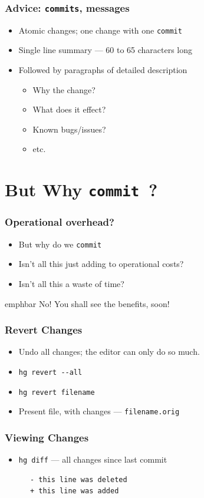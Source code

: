 \documentclass[14pt,compress]{beamer}
\newcommand{\emphbar}[1]
{\begin{beamercolorbox}[rounded=true]{emphbar} 
      {#1}
 \end{beamercolorbox}
}
\newcounter{time}
\newcommand{\typ}[1]{\lstinline{#1}}
\begin{document}
\begin{frame}
  \frametitle{\alert{Advice}: \typ{commits}, messages}
  \begin{itemize}
  \item Atomic changes; one change with one \typ{commit}
  \item Single line summary --- 60 to 65 characters long
  \item Followed by paragraphs of detailed description
    \begin{itemize}
    \item Why the change?
    \item What does it effect?
    \item Known bugs/issues?
    \item etc. 
    \end{itemize}
  \end{itemize}
\end{frame}

\section{But Why \typ{commit}~?}

\begin{frame}
  \frametitle{Operational overhead?}
  \begin{itemize}
  \item But why do we \typ{commit}
  \item Isn't all this just adding to operational costs?
  \item Isn't all this a waste of time?
  \end{itemize}
  \begin{center}
    \emphbar{No! You shall see the benefits, soon!}    
  \end{center}
\end{frame}

\begin{frame}
  \frametitle{Revert Changes}
  \begin{itemize}
  \item Undo all changes; the editor can only do so much.
  \item \typ{hg revert --all}
  \item \typ{hg revert filename}
  \item Present file, with changes --- \typ{filename.orig}
  \end{itemize}
\end{frame}

\begin{frame}[fragile]
  \frametitle{Viewing Changes}
  \begin{itemize}
  \item \typ{hg diff} --- all changes since last commit
  \end{itemize}
  \begin{block}{}
    \begin{lstlisting}
      - this line was deleted
      + this line was added
    \end{lstlisting}
  \end{block}
\end{frame}
\end{document}
